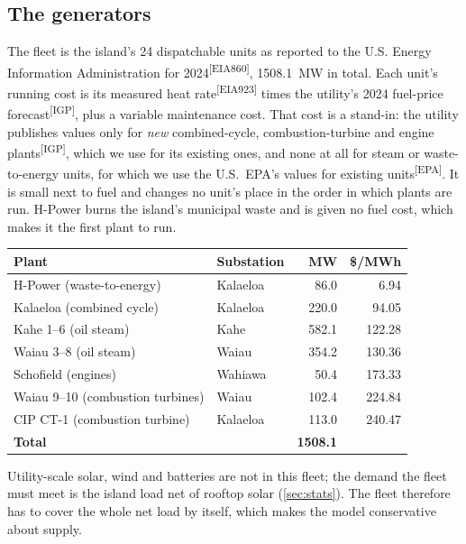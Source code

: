 \documentclass[11pt,a4paper]{article}
\newcommand{\src}[1]{\textsuperscript{[#1]}}
\begin{document}
\subsection{The generators}

The fleet is the island's 24 dispatchable units as reported to the U.S. Energy
Information Administration for 2024\src{EIA860}, \SI{1508.1}{MW} in total. Each unit's
running cost is its measured heat rate\src{EIA923} times the utility's 2024 fuel-price
forecast\src{IGP}, plus a variable maintenance cost. That cost is a stand-in: the
utility publishes values only for \emph{new} combined-cycle, combustion-turbine and
engine plants\src{IGP}, which we use for its existing ones, and none at all for steam
or waste-to-energy units, for which we use the U.S.\ EPA's values for existing
units\src{EPA}. It is small next to fuel and changes no unit's place in the order in
which plants are run. H-Power burns the island's municipal waste and is given no fuel
cost, which makes it the first plant to run.

\begin{center}
\small
\begin{tabular}{@{}llrr@{}}
\toprule
\textbf{Plant} & \textbf{Substation} & \textbf{MW} & \textbf{\$/MWh} \\
\midrule
H-Power (waste-to-energy)      & Kalaeloa & 86.0  & 6.94 \\
Kalaeloa (combined cycle)      & Kalaeloa & 220.0 & 94.05 \\
Kahe 1--6 (oil steam)          & Kahe     & 582.1 & 122.28 \\
Waiau 3--8 (oil steam)         & Waiau    & 354.2 & 130.36 \\
Schofield (engines)            & Wahiawa  & 50.4  & 173.33 \\
Waiau 9--10 (combustion turbines) & Waiau & 102.4 & 224.84 \\
CIP CT-1 (combustion turbine)  & Kalaeloa & 113.0 & 240.47 \\
\midrule
\textbf{Total} & & \textbf{1508.1} & \\
\bottomrule
\end{tabular}
\end{center}

Utility-scale solar, wind and batteries are not in this fleet; the demand the fleet
must meet is the island load net of rooftop solar (\cref{sec:stats}). The fleet
therefore has to cover the whole net load by itself, which makes the model
conservative about supply.

\end{document}
